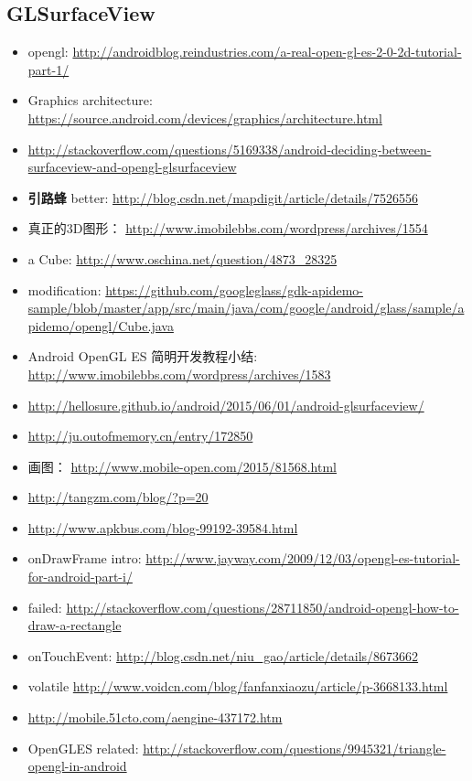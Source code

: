 \documentclass[9pt,b5paper]{article}
\begin{document}
\subsection{GLSurfaceView}
\label{sec-2-5}
\begin{itemize}
\item opengl: \url{http://androidblog.reindustries.com/a-real-open-gl-es-2-0-2d-tutorial-part-1/}
\item Graphics architecture: \url{https://source.android.com/devices/graphics/architecture.html}
\item \url{http://stackoverflow.com/questions/5169338/android-deciding-between-surfaceview-and-opengl-glsurfaceview}
\item \textbf{引路蜂} better: \url{http://blog.csdn.net/mapdigit/article/details/7526556}
\item 真正的3D图形： \url{http://www.imobilebbs.com/wordpress/archives/1554}
\item a Cube: \url{http://www.oschina.net/question/4873_28325}
\item modification: \url{https://github.com/googleglass/gdk-apidemo-sample/blob/master/app/src/main/java/com/google/android/glass/sample/apidemo/opengl/Cube.java}
\item Android OpenGL ES 简明开发教程小结: \url{http://www.imobilebbs.com/wordpress/archives/1583}
\item \url{http://hellosure.github.io/android/2015/06/01/android-glsurfaceview/}
\item \url{http://ju.outofmemory.cn/entry/172850}
\item 画图： \url{http://www.mobile-open.com/2015/81568.html}
\item \url{http://tangzm.com/blog/?p=20}
\item \url{http://www.apkbus.com/blog-99192-39584.html}
\item onDrawFrame intro: \url{http://www.jayway.com/2009/12/03/opengl-es-tutorial-for-android-part-i/}
\item failed: \url{http://stackoverflow.com/questions/28711850/android-opengl-how-to-draw-a-rectangle}
\item onTouchEvent: \url{http://blog.csdn.net/niu_gao/article/details/8673662}
\item volatile \url{http://www.voidcn.com/blog/fanfanxiaozu/article/p-3668133.html}
\item \url{http://mobile.51cto.com/aengine-437172.htm}
\item OpenGLES related: \url{http://stackoverflow.com/questions/9945321/triangle-opengl-in-android}

\end{itemize}
\end{document}

